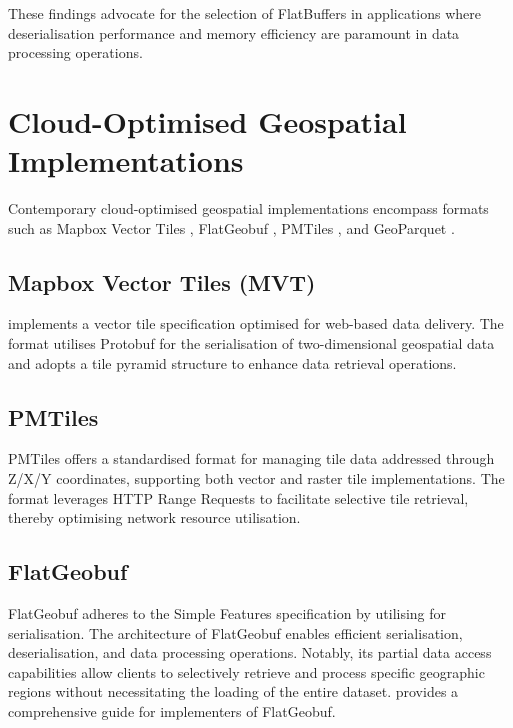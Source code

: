 These findings advocate for the selection of FlatBuffers in applications where deserialisation performance and memory efficiency are paramount in data processing operations.

\section{Cloud-Optimised Geospatial Implementations}
\label{rw:cloud_optimised_implementations}
Contemporary cloud-optimised geospatial implementations encompass formats such as Mapbox Vector Tiles \citep{mapbox-vector-tiles}, FlatGeobuf \citep{flatgeobuf}, PMTiles \citep{pmtiles}, and GeoParquet \citep{geoparquet}.

\subsection{Mapbox Vector Tiles (MVT)}
\label{rw:cloud_optimised_implementations:mvt}
\citet{mapbox-vector-tiles} implements a vector tile specification optimised for web-based data delivery. The format utilises Protobuf for the serialisation of two-dimensional geospatial data and adopts a tile pyramid structure to enhance data retrieval operations.

\subsection{PMTiles}
\label{rw:cloud_optimised_implementations:pmtiles}
PMTiles offers a standardised format for managing tile data addressed through Z/X/Y coordinates, supporting both vector and raster tile implementations. The format leverages HTTP Range Requests \citep{http_range_requests} to facilitate selective tile retrieval, thereby optimising network resource utilisation.

\subsection{FlatGeobuf}
\label{rw:cloud_optimised_implementations:flatgeobuf}
FlatGeobuf adheres to the Simple Features \citet{simple_features} specification by utilising \citet{flatbuffers} for serialisation. The architecture of FlatGeobuf enables efficient serialisation, deserialisation, and data processing operations. Notably, its partial data access capabilities allow clients to selectively retrieve and process specific geographic regions without necessitating the loading of the entire dataset. \citet{horance_2022_detail} provides a comprehensive guide for implementers of FlatGeobuf.

